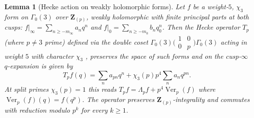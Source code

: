 \documentclass[11pt]{amsart}
\newtheorem{lemma}[theorem]{Lemma}
\theoremstyle{definition}
\theoremstyle{remark}
\newcommand{\Z}{\mathbf{Z}}
\begin{document}
\begin{lemma}[Hecke action on weakly holomorphic forms]\label{lem:hecke-weakly-holomorphic}
Let $f$ be a weight-$5$, $\chi_3$ form on $\Gamma_0(3)$ over $\Z_{(p)}$, weakly holomorphic with finite principal parts at both cusps: $f|_\infty=\sum_{n\ge-m_\infty}a_nq^n$ and $f|_0=\sum_{n\ge-m_0}b_nq_0^n$. Then the Hecke operator $T_p$ (where $p\ne 3$ prime) defined via the double coset $\Gamma_0(3)\bigl(\begin{smallmatrix}1&0\\0&p\end{smallmatrix}\bigr)\Gamma_0(3)$ acting in weight $5$ with character $\chi_3$ \cite[\S 5]{AtkinLehner70}, \cite[\S 5.1]{DS} preserves the space of such forms and on the cusp-$\infty$ $q$-expansion is given by
\[
T_pf(q)=\sum_n a_{pn}q^n+\chi_3(p)p^4\sum_n a_nq^{pn}.
\]
At split primes $\chi_3(p)=1$ this reads $T_p f=\Lambda_p f+p^4\operatorname{Ver}_p(f)$ where $\operatorname{Ver}_p(f)(q)=f(q^p)$. The operator preserves $\Z_{(p)}$-integrality and commutes with reduction modulo $p^k$ for every $k\ge 1$.
\end{lemma}
\end{document}
